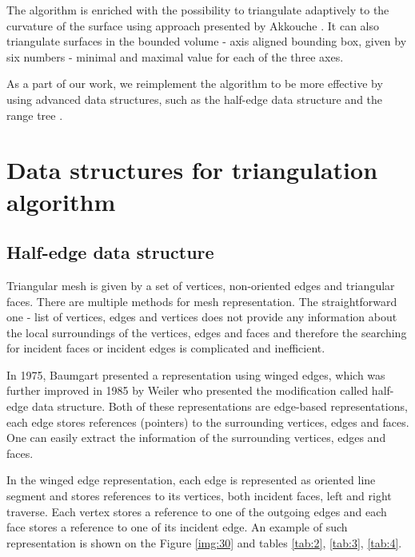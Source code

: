 The algorithm is enriched with the possibility to triangulate adaptively
to the curvature of the surface using approach presented by Akkouche 
\cite{akkouche2001adaptive}. It can also triangulate surfaces in the
bounded volume - axis aligned bounding box, given by six numbers - minimal
and maximal value for each of the three axes.

As a part of our work, we reimplement the algorithm to be more effective by
using advanced data structures, such as the half-edge data structure 
\cite{kettner1999using} and the range tree \cite{lueker1978data}. 
\section{Data structures for triangulation algorithm}
\label{sub2.5}

\subsection*{Half-edge data structure}
Triangular mesh is given by a set of vertices, non-oriented edges and triangular faces.
There are multiple methods for mesh representation. The straightforward one -
list of vertices, edges and vertices does not provide any information about
the local surroundings of the vertices, edges and faces and therefore the searching
for incident faces or incident edges is complicated and inefficient.

In 1975, Baumgart \cite{baumgart1975polyhedron} presented a representation
using winged edges, which was further improved in 1985 by Weiler \cite{weiler1985edge}
who presented the modification called half-edge data structure.
Both of these representations are edge-based representations, each edge stores
references (pointers) to the surrounding vertices, edges and faces. One can easily extract the information of the
surrounding vertices, edges and faces.

In the winged edge representation, each edge is represented as oriented line segment 
and stores references to its vertices, both incident faces, left and right traverse. 
Each vertex stores a reference to one of the outgoing edges and each
face stores a reference to one of its incident edge. An example of such representation
is shown on the Figure \ref{img:30} and tables \ref{tab:2}, \ref{tab:3}, \ref{tab:4}.

